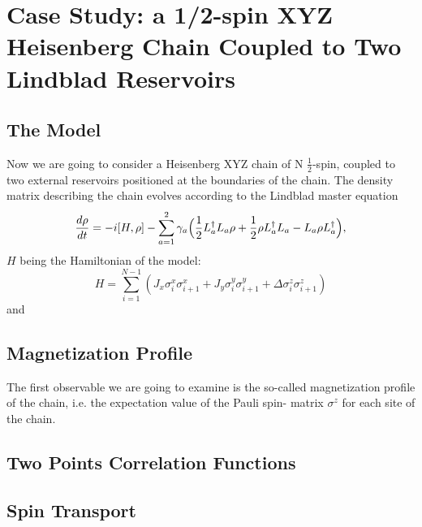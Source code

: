 \chapter{Case Study: a 1/2-spin XYZ Heisenberg Chain Coupled to Two Lindblad Reservoirs}
\label{Chapter3}

\section{The Model}
Now we are going to consider a Heisenberg XYZ chain of N $\frac{1}{2}$-spin, coupled to two external reservoirs positioned at the boundaries of the chain. The density matrix describing the chain evolves according to the Lindblad master equation
\begin{equation}
    \frac{d\rho}{dt} = -i[H, \rho] - \sum_{a=1}^{2}\gamma_a\Bigl(\frac{1}{2}L_a^{\dagger}L_a\rho + \frac{1}{2}\rho L_a^{\dagger}L_a - L_a\rho L_a^{\dagger}\Bigl),
\end{equation}
$H$ being the Hamiltonian of the model:
\begin{equation}
\label{ham_chain}
    H = \sum_{i = 1}^{N-1} (J_x \sigma_i^x \sigma_{i+1}^x + J_y \sigma_i^y \sigma_{i+1}^y + \Delta \sigma_i^z \sigma_{i+1}^z)
\end{equation}
and 


\section{Magnetization Profile}
The first observable we are going to examine is the so-called magnetization profile of the chain, i.e. the expectation value of the Pauli spin- matrix $\sigma^z$ for each site of the chain. 

\section{Two Points Correlation Functions}

\section{Spin Transport}
